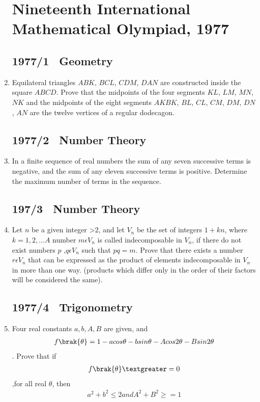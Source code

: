 \documentclass[12pt,-letter paper] {article}
\begin{document}
\begin{enumerate}
\section*{Nineteenth International Mathematical Olympiad, 1977}
		\subsection*{1977/1 \ Geometry }
\item Equilateral triangles $ABK$, $BCL$, $CDM$, $DAN$ are constructed inside the square $ABCD$. Prove that the midpoints of the four segments $KL$, $LM$, $MN$, $NK$ and the midpoints of the eight segments $AKBK$, $BL$, $CL$, $CM$, $DM$, $DN$, $AN$ are the twelve vertices of a regular dodecagon.
	\subsection*{1977/2 \ Number Theory}
\item In a finite sequence of real numbers the sum of any seven successive terms is negative, and the sum of any eleven successive terms is positive. Determine the maximum number of terms in the sequence.
	\subsection*{197/3 \ Number Theory}
\item 	Let $n$ be a given integer \textgreater $2$, and let $V_{n}$ be the set of integers $1+ kn$, where $k = 1, 2 ,\ldots A$ number $m \epsilon V_{n}$ is called indecomposable in $V_{n}$, if there do not exist numbers $p$ ,$q \epsilon V_{n}$ such that $pq = m$. Prove that there exists a number $r \epsilon V_{n}$ that can be expressed as the product of elements indecomposable in $V_{n}$ in more than one way. (products which differ only in the order of their factors will be considered the same).
	\subsection*{1977/4 \ Trigonometry}
\item Four real constants $a, b, A, B$ are given, and \begin{align}
f\brak{\theta} = 1 - a  cos \theta - b sin \theta - A cos 2\theta - B sin 2\theta
\end{align}. Prove that if 
\begin{align}f\brak{\theta} \textgreater= 0 \end{align} ,for all real $\theta$, then 
\begin{align} a^{2} + b^{2} \leq 2 and A^{2} + B^{2} \geq = 1 \end{align}

\end{enumerate}
\end{document}
